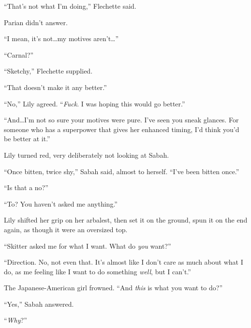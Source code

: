 ``That's not what I'm doing,'' Flechette said.



Parian didn't answer.



``I mean, it's not\ldots my motives aren't\ldots''



``Carnal?''



``Sketchy,'' Flechette supplied.



``That doesn't make it any better.''



``No,'' Lily agreed.  ``\emph{Fuck}.  I was hoping this would go better.''



``And\ldots I'm not so sure your motives were pure.  I've seen you sneak glances.  For someone who has a superpower that gives her enhanced timing, I'd think you'd be better at it.''



Lily turned red, very deliberately not looking at Sabah.



``Once bitten, twice shy,'' Sabah said, almost to herself.  ``I've been bitten once.''



``Is that a no?''



``To?  You haven't asked me anything.''



Lily shifted her grip on her arbalest, then set it on the ground, spun it on the end again, as though it were an oversized top.



``Skitter asked me for what I want.  What do \emph{you} want?''



``Direction.  No, not even that.  It's almost like I don't care as much about what I do, as me feeling like I want to do something \emph{well}, but I can't.''



The Japanese-American girl frowned.  ``And \emph{this} is what you want to do?''



``Yes,'' Sabah answered.



``\emph{Why}?''



